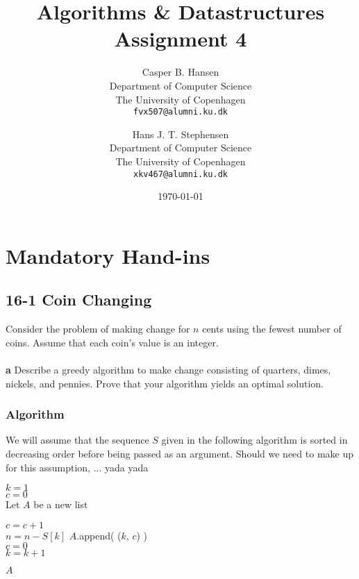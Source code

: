 \documentclass[11pt,english]{article}
\title
{
	\vspace{1in}
	Algorithms \& Datastructures\\
	\huge Assignment 4
}
\author
{
	Casper B. Hansen\\
	\small Department of Computer Science\\
	\small The University of Copenhagen\\
	\texttt{fvx507@alumni.ku.dk}
	\and
	Hans J. T. Stephensen\\
	\small Department of Computer Science\\
	\small The University of Copenhagen\\
	\texttt{xkv467@alumni.ku.dk}
}
\date{\today}
\begin{document}
\clearpage
\maketitle
\thispagestyle{empty}


\newpage
\pagestyle{fancy}

\section*{Mandatory Hand-ins}

\subsection*{16-1 Coin Changing}
\large{Consider the problem of making change for $n$ cents using the fewest
number of coins. Assume that each coin's value is an integer.}
\\\\
\noindent \large{\textbf{a} \mdseries Describe a greedy algorithm to make
change consisting of quarters, dimes, nickels, and pennies. Prove that your
algorithm yields an optimal solution.}

\subsubsection*{Algorithm}
\noindent We will assume that the sequence $S$ given in the following
algorithm is sorted in decreasing order before being passed as an
argument. Should we need to make up for this assumption, ... yada yada

\begin{algorithm}
	
	\BlankLine
	
	$k = 1$\\
	$c = 0$\\
	Let $A$ be a new list
	
	{
		{
			$c = c + 1$\\
			$n = n - S[k]$
		}
		{
			{
				$A$.append( ($k$, $c$) )\\
			}
			$c = 0$\\
			$k = k + 1$
		}
	}
	
	\Return $A$	
\end{algorithm}
\end{document}

